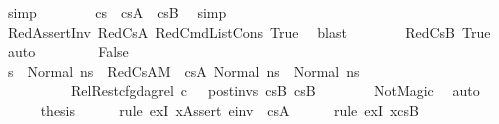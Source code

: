 \begin{isabellebody}
\ simp\isanewline
\ \ \ \ \ \ \isamarkupfalse%
\ {\isacartoucheopen}cs{}\ {\isacharequal}{\kern0pt}\ cs{}A\ {\isacharat}{\kern0pt}\ cs{}B{\isacartoucheclose}\ \isamarkupfalse%
\ simp\ \ \ \ \ \ \ \ \ \ \isanewline
\ \ \ \ \ \ \isamarkupfalse%
\ RedAssertInv\ RedCs{}A\ RedCmdListCons\ True\ \isamarkupfalse%
\ blast\isanewline
\ \ \ \ \ \ \isamarkupfalse%
\ RedCs{}B\ True\ \isamarkupfalse%
\ auto\isanewline
\ \ \isamarkupfalse%
\isanewline
\ \ \ \ \isamarkupfalse%
\ False\isanewline
\ \ \ \ \isamarkupfalse%
\ {\isachardoublequoteopen}s{\isacharprime}{\kern0pt}{\isacharprime}{\kern0pt}\ {\isacharequal}{\kern0pt}\ Normal\ ns{}{\isachardoublequoteclose}\ \ RedCs{}A{\isacharcolon}{\kern0pt}{\isachardoublequoteopen}{\isacharparenleft}{\kern0pt}M{\isacharcomma}{\kern0pt}{\isasymLambda}{\isacharcomma}{\kern0pt}{\isasymGamma}{\isacharcomma}{\kern0pt}{\isasymOmega}\ {\isasymturnstile}\ {\isasymlangle}cs{}A{\isacharcomma}{\kern0pt}\ Normal\ ns{}{\isasymrangle}\ {\isacharbrackleft}{\kern0pt}{\isasymrightarrow}{\isacharbrackright}{\kern0pt}\ Normal\ ns{}{\isacharparenright}{\kern0pt}{\isachardoublequoteclose}\ \isanewline
\ \ \ \ \ \ \ \ \ \ RelRest{\isacharcolon}{\kern0pt}{\isachardoublequoteopen}cfg{\isacharunderscore}{\kern0pt}dag{\isacharunderscore}{\kern0pt}rel\ c\ {\isacharbrackleft}{\kern0pt}{\isacharbrackright}{\kern0pt}\ {\isacharbrackleft}{\kern0pt}{\isacharbrackright}{\kern0pt}\ post{\isacharunderscore}{\kern0pt}invs\ cs{}B\ cs{}B{\isachardoublequoteclose}\isanewline
\ \ \ \ \ \ \isamarkupfalse%
\ NotMagic\ \isamarkupfalse%
\ auto\isanewline
\ \ \ \ \isamarkupfalse%
\ {\isacharquery}{\kern0pt}thesis\isanewline
\ \ \ \ \isamarkupfalse%
\ {\isacharparenleft}{\kern0pt}rule\ exI{\isacharbrackleft}{\kern0pt}\ {\isacharquery}{\kern0pt}x{\isacharequal}{\kern0pt}{\isachardoublequoteopen}Assert\ e{\isacharunderscore}{\kern0pt}inv\ {\isacharhash}{\kern0pt}\ cs{}A{\isachardoublequoteclose}{\isacharbrackright}{\kern0pt}{\isacharparenright}{\kern0pt}\isanewline
\ \ \ \ \isamarkupfalse%
\ {\isacharparenleft}{\kern0pt}rule\ exI{\isacharbrackleft}{\kern0pt}\ {\isacharquery}{\kern0pt}x{\isacharequal}{\kern0pt}{\isachardoublequoteopen}cs{}B{\isachardoublequoteclose}{\isacharbrackright}{\kern0pt}{\isacharparenright}{\kern0pt}\isanewline

\end{isabellebody}
